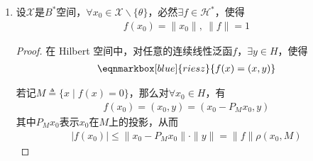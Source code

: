 \begin{enumerate}[leftmargin=2cm, label=\arabic*]
\begin{enumerate}[leftmargin=1cm, label=(\arabic*)]
\begin{proof}
            由\textbf{Hahn-Banach}定理，存在$\mathscr{X}$上的连续线性泛函$f$，使得
            \begin{align*}
                f(x_0) = f_0(x_0) = \|x_0\|,\ \|f\| = \|f_0\|_0 = 1
            \end{align*}
            $\mathscr{X}$上的这个非零连续线性泛函$f$，可以分辨$x_1,x_2$。即
            \begin{align*}
                f(x_1) - f(x_2) = f(x_1-x_2) = f(x_0) \neq 0
            \end{align*}
            故而显然有足够多的连续线性泛函。
        \end{proof}
        \item 设$\mathscr{X}$是$B^*$空间，$\forall x_0\in\mathscr{X}\backslash\{\theta\}$，必然$\exists f\in\mathscr{H}^*$，使得
        \begin{align*}
            f(x_0) = \|x_0\|,\  \|f\| = 1
        \end{align*}
        \begin{proof}
            在 Hilbert 空间中，对任意的连续线性泛函$f$，$\exists y\in H$，使得
            \begin{align*}
                \eqnmarkbox[blue]{riesz}{f(x) = (x, y)}
            \end{align*}

            若记$M\triangleq \{x\mid f(x) = 0\}$，那么对$\forall x_0\in H$，有
            \begin{align*}
                f(x_0) = (x_0, y) = (x_0 - P_Mx_0, y)
            \end{align*}
            其中$P_Mx_0$表示$x_0$在$M$上的投影，从而
            \begin{align*}
                |f(x_0)| \leqslant \|x_0 - P_Mx_0\| \cdot \|y\| = \|f\|\rho(x_0, M)
            \end{align*}


\end{proof}
\end{enumerate}
\end{enumerate}
